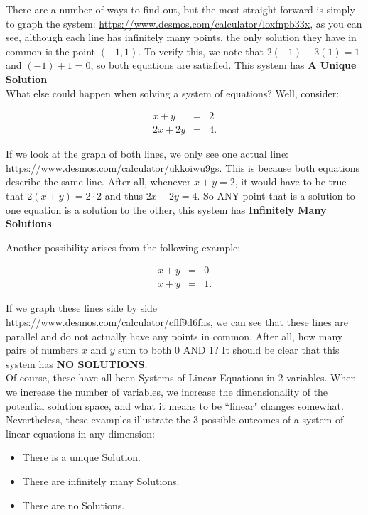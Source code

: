 \documentclass[10pt]{article}
\theoremstyle{definition}
\begin{document}
There are a number of ways to find out, but the most straight forward is simply to graph the system: \url{https://www.desmos.com/calculator/loxfnpb33x}, as you can see, although each line has infinitely many points, the only solution they have in common is the point $(-1,1)$.  To verify this, we note that $2(-1)+3(1)=1$ and $(-1)+1=0$, so both equations are satisfied.  This system has \textbf{A Unique Solution}\\

What else could happen when solving a system of equations?  Well, consider:


\begin{eqnarray*}
x+y&=&2\\
2x+2y&=&4.
\end{eqnarray*}

If we look at the graph of both lines, we only see one actual line: \url{https://www.desmos.com/calculator/ukkoiwu9gs}.  This is because both equations describe the same line.  After all, whenever $x+y=2$, it would have to be true that $2(x+y)=2\cdot2$ and thus $2x+2y=4$.  So ANY point that is a solution to one equation is a solution to the other, this system has \textbf{Infinitely Many Solutions}.\\
\newpage

Another possibility arises from the following example:


\begin{eqnarray*}
x+y&=&0\\
x+y&=&1.
\end{eqnarray*}

If we graph these lines side by side \url{https://www.desmos.com/calculator/cflf9d6fhs}, we can see that these lines are parallel and do not actually have any points in common.  After all, how many pairs of numbers $x$ and $y$ sum to both 0 AND 1?  It should be clear that this system has \textbf{NO SOLUTIONS}.\\

Of course, these have all been Systems of Linear Equations in 2 variables.  When we increase the number of variables, we increase the dimensionality of the potential solution space, and what it means to be ``linear" changes somewhat.  Nevertheless, these examples illustrate the 3 possible outcomes of a system of linear equations in any dimension:

\begin{itemize}
\item There is a unique Solution.
\item There are infinitely many Solutions.
\item There are no Solutions.
\end{itemize}
\end{document}

